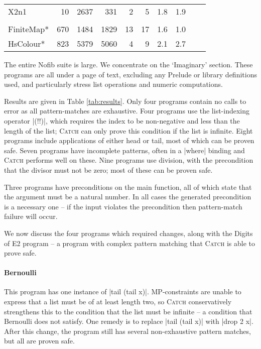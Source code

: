 \documentclass[preprint]{sigplanconf}
\newcommand{\C}[1]{\textsf{#1}}
\newcommand{\catch}{\textsc{Catch}}
\begin{document}
\begin{table}
\begin{tabular*}{\linewidth}{lrrrrrrlll}
\hspace{-2mm} X2n1                         & 10 & 2637 &  331 & 2 &  5 & 1.8 & 1.9 \\
\vspace{-1ex} \\
\hspace{-2mm} FiniteMap*    \hspace{-3mm} & 670 & 1484 & 1829 & 13 & 17 & 1.6 & 1.0 \\
\hspace{-2mm} HsColour*     \hspace{-3mm} & 823 & 5379 & 5060 & 4 &  9 & 2.1 & 2.7 \\
\hline
\end{tabular*}
\end{table}

The entire Nofib suite \citep{nofib} is large. We concentrate on the `Imaginary' section. These programs are all under a page of text, excluding any Prelude or library definitions used, and particularly stress list operations and numeric computations.

Results are given in Table \ref{tab:results}. Only four programs contain no calls to \C{error} as all pattern-matches are exhaustive. Four programs use the list-indexing operator |(!!)|, which requires the index to be non-negative and less than the length of the list; \catch{} can only prove this condition if the list is infinite. Eight programs include applications of either \C{head} or \C{tail}, most of which can be proven safe. Seven programs have incomplete patterns, often in a |where| binding and \catch{} performs well on these. Nine programs use division, with the precondition that the divisor must not be zero; most of these can be proven safe.

Three programs have preconditions on the \C{main} function, all of which state that the argument must be a natural number. In all cases the generated precondition is a necessary one -- if the input violates the precondition then pattern-match failure will occur.

We now discuss the four programs which required changes, along with the Digits of E2 program -- a program with complex pattern matching that \catch{} is able to prove safe.

\paragraph{Bernoulli}

This program has one instance of |tail (tail x)|. MP-constraints are unable to express that a list must be of at least length two, so \catch{} conservatively strengthens this to the condition that the list must be infinite -- a condition that Bernoulli does not satisfy. One remedy is to replace |tail (tail x)| with |drop 2 x|. After this change, the program still has several non-exhaustive pattern matches, but all are proven safe.
\end{document}
